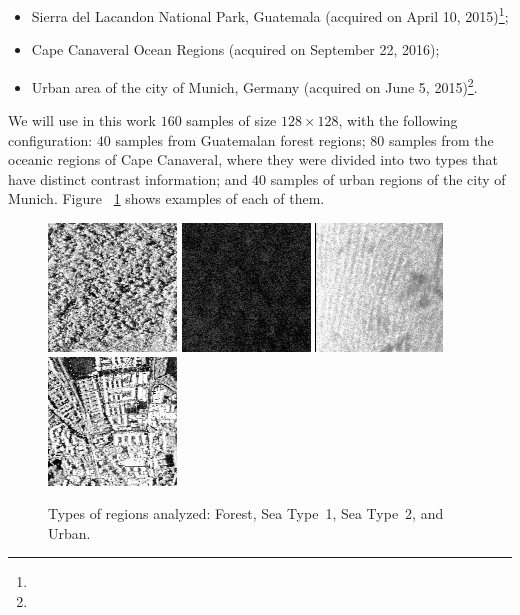 \documentclass[paper=letter, fontsize=12pt]{article}
\begin{document}
\begin{itemize}
	\item Sierra del Lacandon National Park, Guatemala (acquired on April 10, 2015)\footnote{};
	\item Cape Canaveral Ocean Regions (acquired on September 22, 2016);
	\item Urban area of the city of Munich, Germany (acquired on June 5, 2015)\footnote{}.
\end{itemize}
We will use in this work $160$ samples of size $128 \times 128$, with the following configuration:
$40$ samples from Guatemalan forest regions;
$80$ samples from the oceanic regions of Cape Canaveral, where they were divided into two types that have distinct contrast information; and
$40$ samples of urban regions of the city of Munich.
Figure ~\ref{fig:RegionsSAR} shows examples of each of them.

\begin{figure}[hbt]
	\centering
	\includegraphics[width=.23\linewidth]{Figures/guatemalaflorest}
	\includegraphics[width=.23\linewidth]{Figures/Cape1}
	\includegraphics[width=.23\linewidth]{Figures/Cape2}
	\includegraphics[width=.23\linewidth]{Figures/munichUrban}	
	\caption{Types of regions analyzed: Forest, Sea Type~1, Sea Type~2, and Urban.}\label{fig:RegionsSAR}
\end{figure} 
\end{document}
